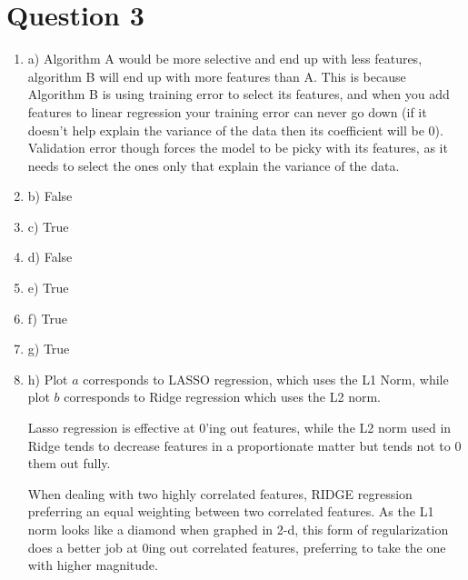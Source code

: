 \documentclass{article}
\theoremstyle{plain}
\theoremstyle{definition}
\begin{document}
\section{Question 3}
\begin{enumerate}
    \item a) Algorithm A would be more selective and end up with less features, algorithm B will end up with more features than A. This is because Algorithm B is using training error to select its features, and when you add features to linear regression your training error can never go down (if it doesn't help explain the variance of the data then its coefficient will be 0). Validation error though forces the model to be picky with its features, as it needs to select the ones only that explain the variance of the data.
    \item b) False 
    \item c) True
    \item d) False
    \item e) True
    \item f) True
    \item g) True
    \item h) Plot $a$ corresponds to LASSO regression,  which uses the L1 Norm, while plot $b$ corresponds to Ridge regression which uses the L2 norm. 
    
    Lasso regression is effective at 0'ing out features, while the L2 norm used in Ridge tends to decrease features in a proportionate matter but tends not to 0 them out fully.
    
    When dealing with two highly correlated features, RIDGE regression preferring an equal weighting between two correlated features. As the L1 norm looks like a diamond when graphed in 2-d, this form of regularization does a better job at 0ing out correlated features, preferring to take the one with higher magnitude.
\end{enumerate}
\end{document}
